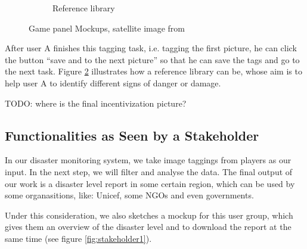 \begin{figure}[H]
\begin{subfigure}[b]{0.45\textwidth}
        \caption{Reference library}
        \label{fig:player3}
    \end{subfigure}
    \caption{Game panel Mockups, satellite image from  \cite{satellite-photo-1}}
\end{figure}

After user A finishes this tagging task,
i.e.
tagging the first picture,
he can click the button ``save and to the next picture'' so that he can save the tags and go to the next task.
Figure \ref{fig:player3} illustrates how a reference library can be,
whose aim is to help user A to identify different signs of danger or damage.

TODO: where is the final incentivization picture?

\subsection{Functionalities as Seen by a Stakeholder}
In our disaster monitoring system, 
we take image taggings from players as our input. 
In the next step, 
we will filter and analyse the data.
The final output of our work is a disaster level report in some certain region,
which can be used by some organasitions,
like: Unicef, some NGOs and even governments.

Under this consideration, 
we also sketches a mockup for this user group,
which gives them an overview of the disaster level and 
to download the report at the same time (see figure \ref{fig:stakeholder1}).

